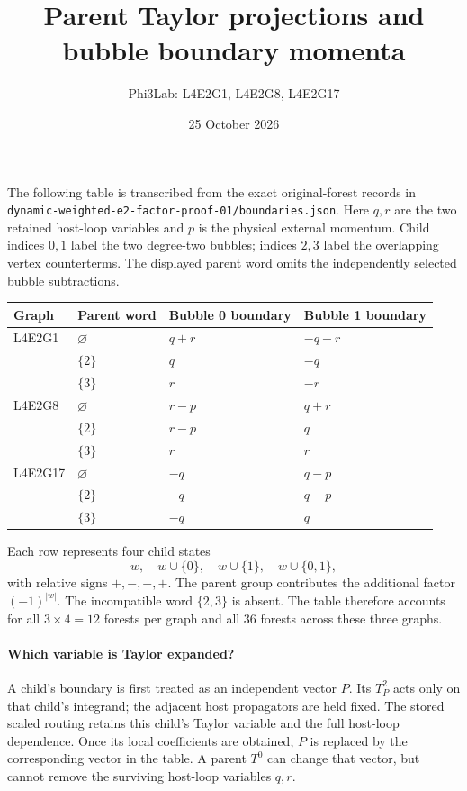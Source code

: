 \documentclass[11pt]{article}
\title{Parent Taylor projections and bubble boundary momenta}
\author{Phi3Lab: L4E2G1, L4E2G8, L4E2G17}
\date{25 October 2026}
\begin{document}
\maketitle
The following table is transcribed from the exact original-forest records in
\texttt{dynamic-weighted-e2-factor-proof-01/boundaries.json}.
Here \(q,r\) are the two retained host-loop variables and \(p\) is the physical external momentum. Child indices \(0,1\) label the two degree-two bubbles; indices \(2,3\) label the overlapping vertex counterterms. The displayed parent word omits the independently selected bubble subtractions.

\begin{center}
\begin{tabular}{llll}
\toprule
Graph & Parent word & Bubble 0 boundary & Bubble 1 boundary\\
\midrule
L4E2G1 & \(\varnothing\) & \(q+r\) & \(-q-r\)\\
       & \(\{2\}\) & \(q\) & \(-q\)\\
       & \(\{3\}\) & \(r\) & \(-r\)\\
\midrule
L4E2G8 & \(\varnothing\) & \(r-p\) & \(q+r\)\\
       & \(\{2\}\) & \(r-p\) & \(q\)\\
       & \(\{3\}\) & \(r\) & \(r\)\\
\midrule
L4E2G17 & \(\varnothing\) & \(-q\) & \(q-p\)\\
        & \(\{2\}\) & \(-q\) & \(q-p\)\\
        & \(\{3\}\) & \(-q\) & \(q\)\\
\bottomrule
\end{tabular}
\end{center}

Each row represents four child states
\[
  w,\quad w\cup\{0\},\quad w\cup\{1\},\quad w\cup\{0,1\},
\]
with relative signs \(+,-,-,+\). The parent group contributes the additional factor
\((-1)^{|w|}\). The incompatible word \(\{2,3\}\) is absent. The table therefore accounts for all \(3\times 4=12\) forests per graph and all 36 forests across these three graphs.

\paragraph{Which variable is Taylor expanded?}
A child's boundary is first treated as an independent vector \(P\). Its \(T_P^2\) acts only on that child's integrand; the adjacent host propagators are held fixed. The stored scaled routing retains this child's Taylor variable and the full host-loop dependence. Once its local coefficients are obtained, \(P\) is replaced by the corresponding vector in the table. A parent \(T^0\) can change that vector, but cannot remove the surviving host-loop variables \(q,r\).
\end{document}
